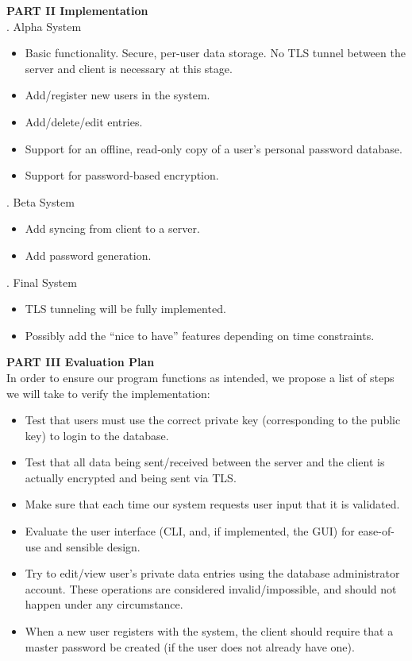 \documentclass[11pt, letterpaper]{article}
\newcommand{\DesignSection}[1]
{\noindent\textbf{#1}\\}
\begin{document}
\DesignSection{PART II Implementation}
. Alpha System
\begin{itemize} \itemsep1pt \parskip0pt 
        \item Basic functionality. Secure, per-user data storage. No \ac{TLS} tunnel between the server and client is necessary at this stage.
\item Add/register new users in the system.
\item Add/delete/edit entries.
\item Support for an offline, read-only copy of a user’s personal password database.
\item Support for password-based encryption.
\end{itemize}
. Beta System
\begin{itemize} \itemsep1pt \parskip0pt 
\item Add syncing from client to a server.
\item Add password generation.
\end{itemize}
. Final System
\begin{itemize} \itemsep1pt \parskip0pt 
\item \ac{TLS} tunneling will be fully implemented.
\item Possibly add the “nice to have” features depending on time constraints.
\end{itemize}

\DesignSection{PART III Evaluation Plan}
\noindent
In order to ensure our program functions as intended, we propose a list of steps we will take to verify the implementation:
\begin{itemize} \itemsep1pt \parskip0pt 
\item Test that users must use the correct private key (corresponding to the public key) to login to the database.
\item Test that all data being sent/received between the server and the client is actually encrypted and being sent via \ac{TLS}.
\item Make sure that each time our system requests user input that it is validated.
\item Evaluate the user interface (\ac{CLI}, and, if implemented, the \ac{GUI}) for ease-of-use and sensible design.
\item Try to edit/view user’s private data  entries using the database administrator account. These operations are considered invalid/impossible, and should not happen under any circumstance.
\item When a new user registers with the system, the client should require that a master password be created (if the user does not already have one).
\end{itemize}
\end{document}
